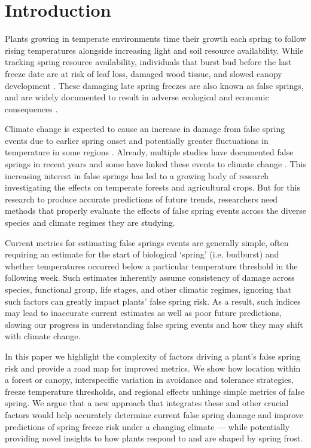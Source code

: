 \documentclass{article}\usepackage[]{graphicx}\usepackage[]{color}
\begin{document}
\section*{Introduction}

Plants growing in temperate environments time their growth each spring to follow rising temperatures alongside increasing light and soil resource availability. While tracking spring resource availability, individuals that burst bud before the last freeze date are at risk of leaf loss, damaged wood tissue, and slowed canopy development \citep{Gu2008, Hufkens2012}. These damaging late spring freezes are also known as false springs, and are widely documented to result in adverse ecological and economic consequences \citep{Knudson2012, Ault2013}.

Climate change is expected to cause an increase in damage from false spring events due to earlier spring onset and potentially greater fluctuations in temperature in some regions \citep{Inouye2008, Martin2010}. Already, multiple studies have documented false springs in recent years \citep{Gu2008, Augspurger2009, Augspurger2013, Menzel2015} and some have linked these events to climate change \citep{Ault2013, Allstadt2015, Muffler2016, Xin2016, Vitra2017}. This increasing interest in false springs has led to a growing body of research investigating the effects on temperate forests and agricultural crops. But for this research to produce accurate predictions of future trends, researchers need methods that properly evaluate the effects of false spring events across the diverse species and climate regimes they are studying. 

Current metrics for estimating false springs events are generally simple, often requiring an estimate for the start of biological `spring' (i.e. budburst) and whether temperatures occurred below a particular temperature threshold in the following week. Such estimates inherently assume consistency of damage across species, functional group, life stages, and other climatic regimes, ignoring that such factors can greatly impact plants' false spring risk. As a result, such indices may lead to inaccurate current estimates as well as poor future predictions, slowing our progress in understanding false spring events and how they may shift with climate change. 

In this paper we highlight the complexity of factors driving a plant's false spring risk and provide a road map for improved metrics. We show how location within a forest or canopy, interspecific variation in avoidance and tolerance strategies, freeze temperature thresholds, and regional effects unhinge simple metrics of false spring. We argue that a new approach that integrates these and other crucial factors would help accurately determine current false spring damage and improve predictions of spring freeze risk under a changing climate --- while potentially providing novel insights to how plants respond to and are shaped by spring frost. %
\end{document}
